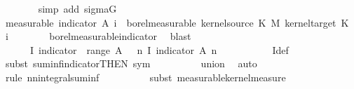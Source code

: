 \begin{isabellebody}
\ \ \ \ \ \ \isamarkupfalse%
\ {\isacharparenleft}{\kern0pt}simp\ add{\isacharcolon}{\kern0pt}\ sigma{\isacharunderscore}{\kern0pt}G{\isacharparenright}{\kern0pt}\isanewline
\ \ \ \ \isamarkupfalse%
\ \isamarkupfalse%
\ {\isacharbrackleft}{\kern0pt}measurable{\isacharbrackright}{\kern0pt}{\isacharcolon}{\kern0pt}\ {\isachardoublequoteopen}indicator\ {\isacharparenleft}{\kern0pt}A\ i{\isacharparenright}{\kern0pt}\ {\isasymin}\ borel{\isacharunderscore}{\kern0pt}measurable\ {\isacharparenleft}{\kern0pt}kernel{\isacharunderscore}{\kern0pt}source\ K\ {\isasymOtimes}\isactrlsub M\ kernel{\isacharunderscore}{\kern0pt}target\ K{\isacharparenright}{\kern0pt}{\isachardoublequoteclose}\ \ i\isanewline
\ \ \ \ \ \ \isamarkupfalse%
\ borel{\isacharunderscore}{\kern0pt}measurable{\isacharunderscore}{\kern0pt}indicator\ \isamarkupfalse%
\ blast\isanewline
\ \ \ \ \ \ \isamarkupfalse%
\ {\isachardoublequoteopen}{\isasymAnd}{\isasymomega}\ {\isasymomega}\ {\isasymin}\ {\isacharquery}{\kern0pt}{\isasymOmega}\ {\isasymLongrightarrow}\ I\ {\isacharparenleft}{\kern0pt}indicator\ {\isacharparenleft}{\kern0pt}{\isasymUnion}\ {\isacharparenleft}{\kern0pt}range\ A{\isacharparenright}{\kern0pt}{\isacharparenright}{\kern0pt}{\isacharparenright}{\kern0pt}\ {\isasymomega}\ {\isacharequal}{\kern0pt}\ {\isacharparenleft}{\kern0pt}{\isasymSum}n{\isachardot}{\kern0pt}\ I\ {\isacharparenleft}{\kern0pt}indicator\ {\isacharparenleft}{\kern0pt}A\ n{\isacharparenright}{\kern0pt}{\isacharparenright}{\kern0pt}\ {\isasymomega}\isanewline
\ \ \ \ \ \ \ \ \isamarkupfalse%
\ I{\isacharunderscore}{\kern0pt}def\isanewline
\ \ \ \ \ \ \ \ \isamarkupfalse%
\ {\isacharparenleft}{\kern0pt}subst\ suminf{\isacharunderscore}{\kern0pt}indicator{\isacharbrackleft}{\kern0pt}THEN\ sym{\isacharbrackright}{\kern0pt}{\isacharparenright}{\kern0pt}\isanewline
\ \ \ \ \ \ \ \ \isamarkupfalse%
\ union\ \isamarkupfalse%
\ auto\isanewline
\ \ \ \ \ \ \ \ \isamarkupfalse%
\ {\isacharparenleft}{\kern0pt}rule\ nn{\isacharunderscore}{\kern0pt}integral{\isacharunderscore}{\kern0pt}suminf{\isacharparenright}{\kern0pt}\isanewline
\ \ \ \ \ \ \ \ \isamarkupfalse%
\ {\isacharparenleft}{\kern0pt}subst\ measurable{\isacharunderscore}{\kern0pt}kernel{\isacharunderscore}{\kern0pt}measure{\isacharparenright}{\kern0pt}\isanewline

\end{isabellebody}
